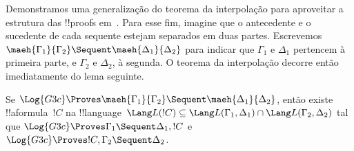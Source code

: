 \documentclass[../../../include/open-logic-section]{subfiles}
\begin{document}
Demonstramos uma generalização do teorema da interpolação para aproveitar
a estrutura das !!{proof}s em~. Para esse fim, imagine que o
antecedente e o sucedente de cada sequente estejam separados em duas
partes. Escrevemos $\maeh{\Gamma_1}{\Gamma_2} \Sequent
\maeh{\Delta_1}{\Delta_2}$ para indicar que $\Gamma_1$ e $\Delta_1$
pertencem à primeira parte, e $\Gamma_2$ e $\Delta_2$, à segunda. O
teorema da interpolação decorre então imediatamente do lema seguinte.

\begin{lem} Se $\Log{G3c}
\Proves \maeh{\Gamma_1}{\Gamma_2} \Sequent \maeh{\Delta_1}{\Delta_2}$,
então existe !!a{formula}~$!C$ na !!{language}~$\Lang L(!C)
\subseteq \Lang L(\Gamma_1,
\Delta_1) \cap \Lang L(\Gamma_2, \Delta_2)$ tal que $\Log{G3c}
\Proves \Gamma_1 \Sequent \Delta_1, !C$ e $\Log{G3c} \Proves !C,
\Gamma_2 \Sequent \Delta_2$.
\end{lem}
\end{document}
